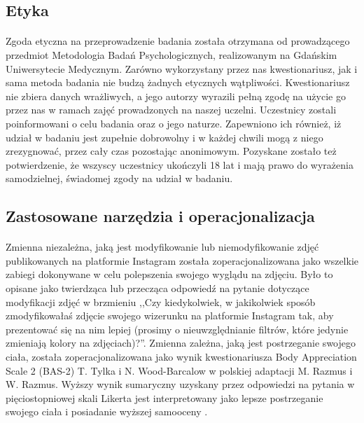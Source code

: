 \documentclass[12pt,a4paper,final,oneside,onecolumn,titlepage]{article}
\begin{document}
\subsection*{\normalsize{\textbf{Etyka}}}
\paragraph{}
Zgoda etyczna na przeprowadzenie badania została otrzymana od prowadzącego przedmiot Metodologia Badań Psychologicznych, realizowanym na Gdańskim Uniwersytecie Medycznym. Zarówno wykorzystany przez nas kwestionariusz, jak i sama metoda badania nie budzą żadnych etycznych wątpliwości. Kwestionariusz nie zbiera danych wrażliwych, a jego autorzy wyrazili pełną zgodę na użycie go przez nas w ramach zajęć prowadzonych na naszej uczelni. Uczestnicy zostali poinformowani o celu badania oraz o jego naturze. Zapewniono ich również, iż udział w badaniu jest zupełnie dobrowolny i w każdej chwili mogą z niego zrezygnować, przez cały czas pozostając anonimowym. Pozyskane zostało też potwierdzenie, że wszyscy uczestnicy ukończyli 18 lat i mają prawo do wyrażenia samodzielnej, świadomej zgody na udział w badaniu. 
\subsection*{\normalsize{\textbf{Zastosowane narzędzia i operacjonalizacja}}}
\paragraph{}
Zmienna niezależna, jaką jest modyfikowanie lub niemodyfikowanie zdjęć publikowanych na platformie Instagram została zoperacjonalizowana jako wszelkie zabiegi dokonywane w celu polepszenia swojego wyglądu na zdjęciu. Było to opisane jako twierdząca lub przecząca odpowiedź na pytanie dotyczące modyfikacji zdjęć w brzmieniu ,,Czy kiedykolwiek, w jakikolwiek sposób zmodyfikowałaś zdjęcie swojego wizerunku na platformie Instagram tak, aby prezentować się na nim lepiej (prosimy o nieuwzględnianie filtrów, które jedynie zmieniają kolory na zdjęciach)?''. Zmienna zależna, jaką jest postrzeganie swojego ciała, została zoperacjonalizowana jako wynik kwestionariusza Body Appreciation Scale 2 (BAS-2) T. Tylka i N. Wood-Barcalow w polskiej adaptacji M. Razmus i W. Razmus. Wyższy wynik sumaryczny uzyskany przez odpowiedzi na pytania w pięciostopniowej skali Likerta jest interpretowany jako lepsze postrzeganie swojego ciała i posiadanie wyższej samooceny \citep{razmus_evaluating_2017,tylka_body_2015}.
\end{document}
